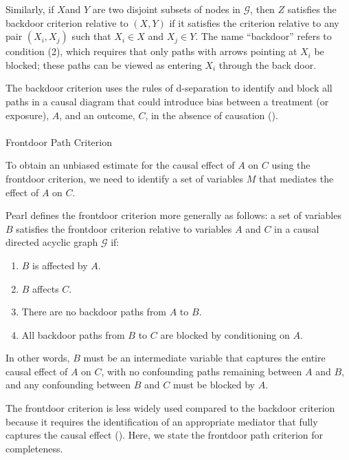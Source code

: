 \documentclass[
  single column]{article}
\makeatletter
\let\oldparagraph\paragraph
\renewcommand{\paragraph}{
    \@ifstar
      \xxxParagraphStar
      \xxxParagraphNoStar
  }
\newcommand{\xxxParagraphStar}[1]{\oldparagraph*{#1}\mbox{}}
\newcommand{\xxxParagraphNoStar}[1]{\oldparagraph{#1}\mbox{}}
\providecommand{\tightlist}{%
  \setlength{\itemsep}{0pt}\setlength{\parskip}{0pt}}\usepackage{longtable,booktabs,array}
\makeatother
\begin{document}
Similarly, if \(X\)and \(Y\) are two disjoint subsets of nodes in
\(\mathcal{G}\), then \(Z\) satisfies the backdoor criterion relative to
\((X, Y)\) if it satisfies the criterion relative to any pair
\((X_i, X_j)\) such that \(X_i \in X\) and \(X_j \in Y\). The name
``backdoor'' refers to condition (2), which requires that only paths
with arrows pointing at \(X_i\) be blocked; these paths can be viewed as
entering \(X_i\) through the back door.

The backdoor criterion uses the rules of d-separation to identify and
block all paths in a causal diagram that could introduce bias between a
treatment (or exposure), \(A\), and an outcome, \(C\), in the absence of
causation ().

\paragraph{Frontdoor Path Criterion}\label{frontdoor-path-criterion}

To obtain an unbiased estimate for the causal effect of \(A\) on \(C\)
using the frontdoor criterion, we need to identify a set of variables
\(M\) that mediates the effect of \(A\) on \(C\).

Pearl defines the frontdoor criterion more generally as follows: a set
of variables \(B\) satisfies the frontdoor criterion relative to
variables \(A\) and \(C\) in a causal directed acyclic graph
\(\mathcal{G}\) if:

\begin{enumerate}
\def\labelenumi{\arabic{enumi}.}
\tightlist
\item
  \(B\) is affected by \(A\).
\item
  \(B\) affects \(C\).
\item
  There are no backdoor paths from \(A\) to \(B\).
\item
  All backdoor paths from \(B\) to \(C\) are blocked by conditioning on
  \(A\).
\end{enumerate}

In other words, \(B\) must be an intermediate variable that captures the
entire causal effect of \(A\) on \(C\), with no confounding paths
remaining between \(A\) and \(B\), and any confounding between \(B\) and
\(C\) must be blocked by \(A\).

The frontdoor criterion is less widely used compared to the backdoor
criterion because it requires the identification of an appropriate
mediator that fully captures the causal effect
(). Here, we state the frontdoor
path criterion for completeness.
\end{document}
